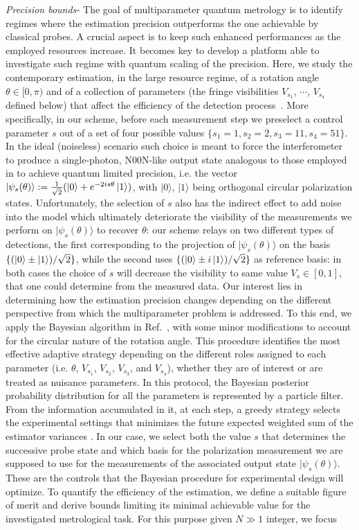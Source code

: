 \documentclass[aps,pra,twocolumn,notitlepage,superscriptaddress]{revtex4-1}
\begin{document}
\emph{Precision bounds-}
%
The goal of multiparameter quantum metrology is to identify regimes where the estimation precision outperforms the one achievable by classical probes. A crucial aspect is to keep such enhanced performances as the employed resources increase. It becomes key to develop a platform able to investigate such regime with quantum scaling of the precision. Here, we study the contemporary estimation, in the large resource regime, of a rotation angle $\theta\in [0,\pi)$ and of a collection of parameters (the fringe visibilities $V_{s_1}$, $\cdots$, $V_{s_4}$ defined below) that affect the efficiency of the detection process~\cite{dambrosio_gear2013}. More specifically, in our scheme, before each measurement step we preselect a control parameter $s$ out of a set of four possible values $\{s_1=1,s_2=2,s_3=11,s_4=51\}$. In the ideal (noiseless) scenario such choice is meant to force the interferometer to produce a single-photon, N00N-like output state analogous to those employed in \cite{higgins2007entanglement} to achieve quantum limited precision, i.e. the vector $|\psi_s(\theta)\rangle:=\frac{1}{\sqrt{2}} (\ket{0}+e^{-2is\theta}\ket{1})$, with $|0\rangle$, $|1\rangle$ being orthogonal circular polarization states. Unfortunately, the selection of $s$ also has the indirect effect to add noise into the model which ultimately deteriorate the visibility of the measurements we perform on $|\psi_s(\theta)\rangle$ to recover $\theta$: our scheme relays on two different types of detections, the first corresponding to the projection of $|\psi_s(\theta)\rangle$ on the basis $\{ (\ket{0}\pm \ket{1})/\sqrt{2}\}$, while the second uses $\{ (\ket{0}\pm i \ket{1})/\sqrt{2}\}$ as reference basis: in both cases the choice of $s$ will decrease the visibility to same value $V_s\in[0,1]$, that one could determine from the measured data. Our interest lies in determining how the estimation precision changes depending on the different perspective from which the multiparameter problem is addressed. To this end, we apply the Bayesian algorithm in Ref.~\cite{granade2012robust}, with some minor modifications to account for the circular nature of the rotation angle. This procedure identifies the most effective adaptive strategy depending on the different roles assigned to each parameter (i.e. $\theta$, $V_{s_1}$, $V_{s_2}$, $V_{s_3}$, and $V_{s_4}$), whether they are of interest or are treated as nuisance parameters. In this protocol, the Bayesian posterior probability distribution for all the parameters is represented by a particle filter. From the information accumulated in it, at each step, a greedy strategy selects the experimental settings that minimizes the future expected weighted sum of the estimator variances \cite{granade2012robust}. In our case, we select both the value $s$ that determines the successive probe state and which basis for the polarization measurement we are supposed to use for the measurements of the associated output state $|\psi_s(\theta)\rangle$. These are the controls that the Bayesian procedure for experimental design will optimize. To quantify the efficiency of the estimation, we define a suitable figure of merit and derive bounds limiting its minimal achievable value for the investigated metrological task. For this purpose given $N\gg 1$ integer, we focus 
\end{document}
